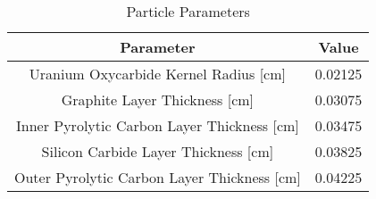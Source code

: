 \begin{table}[h!]
\centering
\begin{tabular}{|| c || c |}
\hline
Parameter & Value \\
\hline \hline
Uranium Oxycarbide Kernel Radius [cm] & 0.02125 \\
Graphite Layer Thickness [cm] & 0.03075 \\
Inner Pyrolytic Carbon Layer Thickness [cm] & 0.03475 \\
Silicon Carbide Layer Thickness [cm] & 0.03825 \\
Outer Pyrolytic Carbon Layer Thickness [cm] & 0.04225 \\
\hline
\end{tabular}
\caption{Particle Parameters}
\label{table:params3}
\end{table}